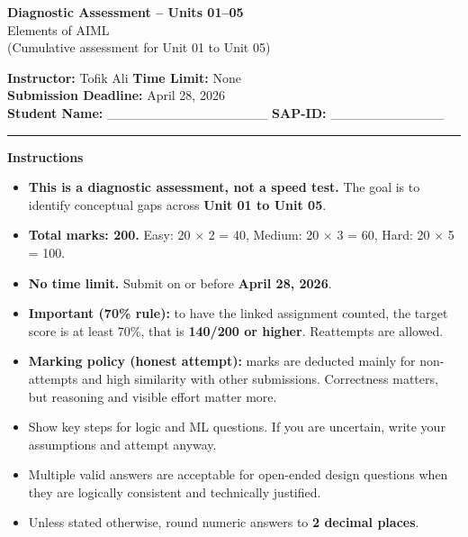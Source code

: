 \documentclass[11pt,a4paper]{article}
\newcommand{\SubmissionDeadline}{April 28, 2026}
\begin{document}
\begin{center}
  {\LARGE \textbf{Diagnostic Assessment -- Units 01--05}}\\[0.25em]
  {\large Elements of AIML}\\[0.25em]
  \normalsize (Cumulative assessment for Unit 01 to Unit 05)
\end{center}

\noindent
\textbf{Instructor:} Tofik Ali \hfill \textbf{Time Limit:} None\\
\textbf{Submission Deadline:} \SubmissionDeadline\\
\textbf{Student Name:} \_\_\_\_\_\_\_\_\_\_\_\_\_\_\_\_\_ \hfill \textbf{SAP-ID:} \_\_\_\_\_\_\_\_\_\_\_\_\\

\vspace{0.6em}
\hrule
\vspace{0.8em}

\textbf{Instructions}
\begin{itemize}[leftmargin=*]
  \item \textbf{This is a diagnostic assessment, not a speed test.} The goal is to identify conceptual gaps across \textbf{Unit 01 to Unit 05}.
  \item \textbf{Total marks: 200.} Easy: 20 $\times$ 2 = 40, Medium: 20 $\times$ 3 = 60, Hard: 20 $\times$ 5 = 100.
  \item \textbf{No time limit.} Submit on or before \textbf{\SubmissionDeadline}.
  \item \textbf{Important (70\% rule):} to have the linked assignment counted, the target score is at least 70\%,
    that is \textbf{140/200 or higher}. Reattempts are allowed.
  \item \textbf{Marking policy (honest attempt):} marks are deducted mainly for non-attempts and high similarity with other submissions.
    Correctness matters, but reasoning and visible effort matter more.
  \item Show key steps for logic and ML questions. If you are uncertain, write your assumptions and attempt anyway.
  \item Multiple valid answers are acceptable for open-ended design questions when they are logically consistent and technically justified.
  \item Unless stated otherwise, round numeric answers to \textbf{2 decimal places}.
\end{itemize}

\vspace{0.6em}
\end{document}
